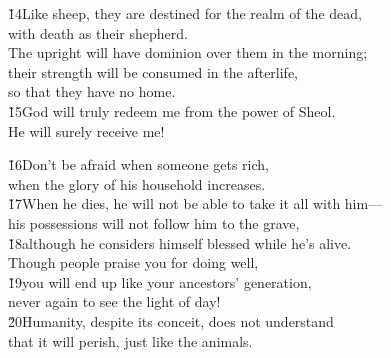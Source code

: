 \begin{poetry}
\poeml \v{14}Like sheep, they are destined for the realm of the dead, \\
\poemll    with death as their shepherd. \\
\poeml The upright will have dominion over them in the morning; \\
\poemll    their strength will be consumed in the afterlife, \\
\poemlll       so that they have no home. \\
\poeml \v{15}God will truly redeem me from the power of Sheol. \\
\poemll    He will surely receive me!
\end{poetry}

\begin{poetry}
\poeml \v{16}Don't be afraid when someone gets rich, \\
\poemll    when the glory of his household increases. \\
\poeml \v{17}When he dies, he will not be able to take it all with him--- \\
\poemll    his possessions will not follow him to the grave, \\
\poeml \v{18}although he considers himself blessed while he's alive. \\
\poeml Though people praise you for doing well, \\
\poeml \v{19}you will end up like your ancestors' generation, \\
\poemlll       never again to see the light of day! \\
\poeml \v{20}Humanity, despite its conceit, does not understand \\
\poemll    that it will perish, just like the animals.
\end{poetry}

